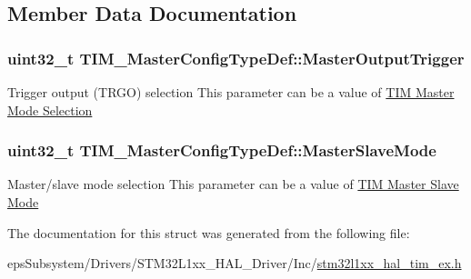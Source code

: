 \subsection{Member Data Documentation}
\hypertarget{struct_t_i_m___master_config_type_def_a908a6c1b46cb203c0b8b59b490e1114e}{
\subsubsection[{Master\-Output\-Trigger}]{\setlength{\rightskip}{0pt plus 5cm}uint32\-\_\-t T\-I\-M\-\_\-\-Master\-Config\-Type\-Def\-::\-Master\-Output\-Trigger}}\label{struct_t_i_m___master_config_type_def_a908a6c1b46cb203c0b8b59b490e1114e}
Trigger output (T\-R\-G\-O) selection This parameter can be a value of \hyperlink{group___t_i_m___master___mode___selection}{T\-I\-M Master Mode Selection} \hypertarget{struct_t_i_m___master_config_type_def_a45ddfca310a1180e19fc24b36f8e9585}{
\subsubsection[{Master\-Slave\-Mode}]{\setlength{\rightskip}{0pt plus 5cm}uint32\-\_\-t T\-I\-M\-\_\-\-Master\-Config\-Type\-Def\-::\-Master\-Slave\-Mode}}\label{struct_t_i_m___master_config_type_def_a45ddfca310a1180e19fc24b36f8e9585}
Master/slave mode selection This parameter can be a value of \hyperlink{group___t_i_m___master___slave___mode}{T\-I\-M Master Slave Mode} 

The documentation for this struct was generated from the following file\-:\begin{DoxyCompactItemize}
\item 
eps\-Subsystem/\-Drivers/\-S\-T\-M32\-L1xx\-\_\-\-H\-A\-L\-\_\-\-Driver/\-Inc/\hyperlink{stm32l1xx__hal__tim__ex_8h}{stm32l1xx\-\_\-hal\-\_\-tim\-\_\-ex.\-h}\end{DoxyCompactItemize}

